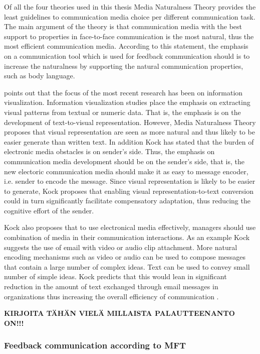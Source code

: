 \documentclass[english,12pt,a4paper,pdftex]{article}
\begin{document}
Of all the four theories used in this thesis Media Naturalness Theory provides the least guidelines to communication media choice per different communication task. The main argument of the theory is that communication media with the best support to properties in face-to-face communication is the most natural, thus the most efficient communication media. According to this statement, the emphasis on a communication tool which is used for feedback communication should is to increase the naturalness by supporting the natural communication properties, such as body language. \citep{kock2005} \citep{kock2004}

\citet{kock2007} points out that the focus of the most recent research has been on information visualization. Information visualization studies place the emphasis on extracting visual patterns from textual or numeric data. That is, the emphasis is on the development of text-to-visual representation. However, Media Naturalness Theory proposes that visual representation are seen as more natural and thus likely to be easier generate than written text. In addition Kock has stated that the burden of electronic media obstacles is on sender's side. Thus, the emphasis on communication media development should be on the sender's side, that is, the new electoric communication media should make it as easy to message encoder, i.e. sender to encode the message. Since visual representation is likely to be easier to generate, Kock proposes that enabling visual representation-to-text conversion could in turn significantly facilitate compensatory adaptation, thus reducing the cognitive effort of the sender.

Kock also proposes that to use electronical media effectively, managers should use combination of media in their communication interactions. As an example Kock suggests the use of email with video or audio clip attachment. More natural encoding mechanisms such as video or audio can be used to compose messages that contain a large number of complex ideas. Text can be used to convey small number of simple ideas. Kock predicts that this would lean in significant reduction in the amount of text exchanged through email messages in organizations thus increasing the overall efficiency of communication \citet{kock2007}.

\textbf{KIRJOITA TÄHÄN VIELÄ MILLAISTA PALAUTTEENANTO ON!!!}

\subsubsection{Feedback communication according to MFT}
\label{sec:feedback_mft}
\end{document}
